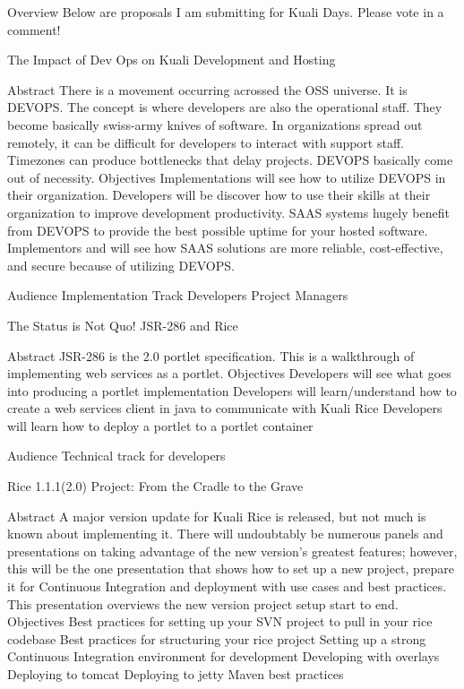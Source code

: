 \documentclass[12pt,notitlepage]{article}
\author{Leo Przybylski}
\begin{document}
Overview
Below are proposals I am submitting for Kuali Days. Please vote in a comment!

The Impact of Dev Ops on Kuali Development and Hosting

Abstract
There is a movement occurring acrossed the OSS universe. It is DEVOPS. The concept is where developers are also the operational staff. They become basically swiss-army knives of software. In organizations spread out remotely, it can be difficult for developers to interact with support staff. Timezones can produce bottlenecks that delay projects. DEVOPS basically come out of necessity. 
Objectives
Implementations will see how to utilize DEVOPS in their organization.
Developers will be discover how to use their skills at their organization to improve development productivity.
SAAS systems hugely benefit from DEVOPS to provide the best possible uptime for your hosted software. Implementors and will see how SAAS solutions are more reliable, cost-effective, and secure because of utilizing DEVOPS.

Audience
Implementation Track
Developers
Project Managers

The Status is Not Quo! JSR-286 and Rice

Abstract
JSR-286 is the 2.0 portlet specification. This is a walkthrough of implementing web services as a portlet.
Objectives
Developers will see what goes into producing a portlet implementation
Developers will learn/understand how to create a web services client in java to communicate with Kuali Rice
Developers will learn how to deploy a portlet to a portlet container

Audience
Technical track for developers

Rice 1.1.1(2.0) Project: From the Cradle to the Grave

Abstract
A major version update for Kuali Rice is released, but not much is known about implementing it. There will undoubtably be numerous panels and presentations on taking advantage of the new version’s greatest features; however, this will be the one presentation that shows how to set up a new project, prepare it for Continuous Integration and deployment with use cases and best practices. This presentation overviews the new version project setup start to end.
Objectives
Best practices for setting up your SVN project to pull in your rice codebase
Best practices for structuring your rice project
Setting up a strong Continuous Integration environment for development
Developing with overlays
Deploying to tomcat
Deploying to jetty
Maven best practices
\end{document}
